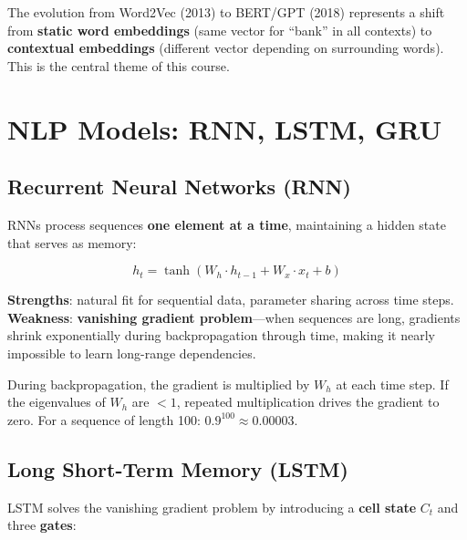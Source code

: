 \documentclass[11pt,a4paper]{article}
\begin{document}
\begin{tcolorbox}[warnbox={The Big Shift}]
The evolution from Word2Vec (2013) to BERT/GPT (2018) represents a shift from \textbf{static word embeddings} (same vector for ``bank'' in all contexts) to \textbf{contextual embeddings} (different vector depending on surrounding words). This is the central theme of this course.
\end{tcolorbox}

\section{NLP Models: RNN, LSTM, GRU}

\subsection{Recurrent Neural Networks (RNN)}

RNNs process sequences \textbf{one element at a time}, maintaining a hidden state that serves as memory:

\begin{equation}
h_t = \tanh(W_h \cdot h_{t-1} + W_x \cdot x_t + b)
\end{equation}

\textbf{Strengths}: natural fit for sequential data, parameter sharing across time steps.\\
\textbf{Weakness}: \textbf{vanishing gradient problem}---when sequences are long, gradients shrink exponentially during backpropagation through time, making it nearly impossible to learn long-range dependencies.

\begin{tcolorbox}[intuitionbox={Why Gradients Vanish}]
During backpropagation, the gradient is multiplied by $W_h$ at each time step. If the eigenvalues of $W_h$ are $< 1$, repeated multiplication drives the gradient to zero. For a sequence of length 100: $0.9^{100} \approx 0.00003$.
\end{tcolorbox}

\subsection{Long Short-Term Memory (LSTM)}

LSTM solves the vanishing gradient problem by introducing a \textbf{cell state} $C_t$ and three \textbf{gates}:
\end{document}

